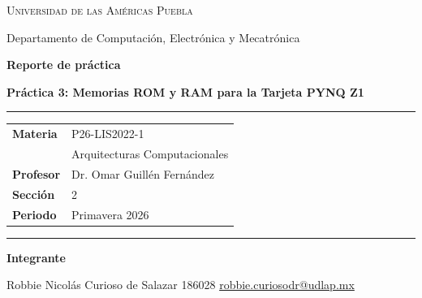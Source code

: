 \documentclass[12pt,letterpaper]{article}
\begin{document}
\begin{titlepage}
\thispagestyle{empty}
\begin{center}
\vspace*{0.8cm}

{\Large \textsc{Universidad de las Américas Puebla}}\par
{\small Departamento de Computación, Electrónica y Mecatrónica}\par

\vspace{1.2cm}

{\Huge \textbf{Reporte de práctica}}\par
\vspace{0.15cm}
{\Large \textbf{Práctica 3: Memorias ROM y RAM para la Tarjeta PYNQ Z1}}\par

\vspace{1.0cm}

\begin{minipage}{0.92\textwidth}
\rule{\textwidth}{0.8pt}\par
\vspace{0.35cm}

\begin{tabular}{@{}L{0.30\textwidth}L{0.62\textwidth}@{}}
\textbf{Materia} & P26-LIS2022-1\\
& Arquitecturas Computacionales\\
\textbf{Profesor} & Dr. Omar Guillén Fernández\\
\textbf{Sección} & 2\\
\textbf{Periodo} & Primavera 2026\\
\end{tabular}

\vspace{0.35cm}
\rule{\textwidth}{0.8pt}
\end{minipage}

\vfill

\begin{minipage}{0.92\textwidth}
\textbf{Integrante}\par
\vspace{0.25cm}
Robbie Nicolás Curioso de Salazar \hfill 186028 \hfill \href{mailto:robbie.curiosodr@udlap.mx}{robbie.curiosodr@udlap.mx}\par
\end{minipage}

\vspace{0.6cm}

\end{center}
\end{titlepage}
\end{document}
